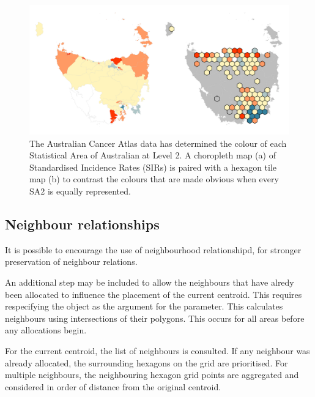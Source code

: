 \documentclass[
]{jss}
\begin{document}
\begin{CodeChunk}
\begin{figure}

{\centering \includegraphics[width=1\linewidth]{figures/7SIR} 

}

\caption[The Australian Cancer Atlas data has determined the colour of each Statistical Area of Australian at Level 2]{The Australian Cancer Atlas data has determined the colour of each Statistical Area of Australian at Level 2. A choropleth map (a) of Standardised Incidence Rates (SIRs) is paired with a hexagon tile map (b) to contrast the colours that are made obvious when every SA2 is equally represented.}\label{fig:sir}
\end{figure}
\end{CodeChunk}

\hypertarget{neighbour-relationships}{%
\subsection{Neighbour relationships}\label{neighbour-relationships}}

It is possible to encourage the use of neighbourhood relationshipd, for
stronger preservation of neighbour relations.

An additional step may be included to allow the neighbours that have
alredy been allocated to influence the placement of the current
centroid. This requires respecifying the  object as the
argument for the  parameter. This calculates
neighbours using intersections of their polygons. This occurs for all
areas before any allocations begin.

For the current centroid, the list of neighbours is consulted. If any
neighbour was already allocated, the surrounding hexagons on the grid
are prioritised. For multiple neighbours, the neighbouring hexagon grid
points are aggregated and considered in order of distance from the
original centroid.
\end{document}
